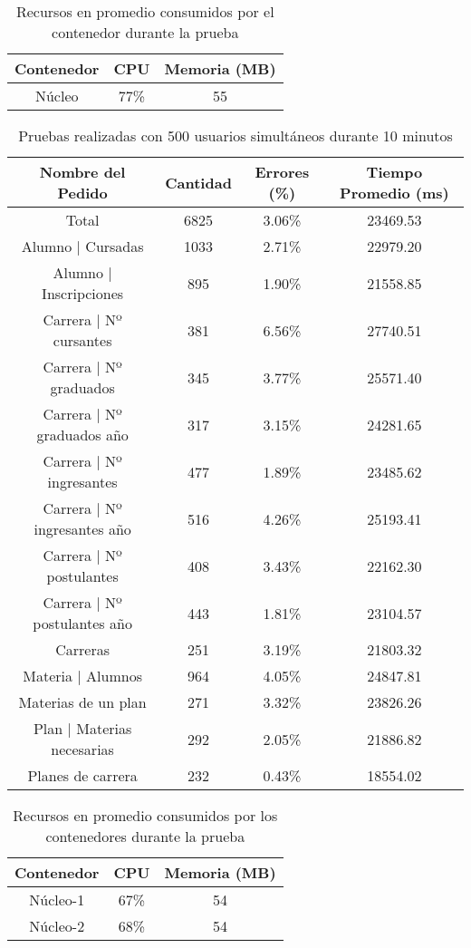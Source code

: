 \begin{table}[]
    \centering
    \makegapedcells
    \begin{tabular}{|c|c|c}
    \hline
    Contenedor & CPU & Memoria (MB)\\ \hline
    Núcleo & 77\% & 55 \\ \hline
    \end{tabular}
    \caption{Recursos en promedio consumidos por el contenedor durante la prueba}
    \label{tab:tabla_planes}
\end{table}

\begin{table}[]
    \centering
    \makegapedcells
    \begin{tabular}{|c|c|c|c|}
    \hline
    Nombre del Pedido & Cantidad & Errores (\%) & Tiempo Promedio (ms) \\ \hline
    Total & 6825 & 3.06\% & 23469.53 \\ \hline
    Alumno | Cursadas & 1033 & 2.71\% & 22979.20 \\ \hline
    Alumno | Inscripciones & 895 & 1.90\% & 21558.85\\ \hline
    Carrera | Nº cursantes & 381 & 6.56\% & 27740.51\\ \hline
    Carrera | Nº graduados & 345 & 3.77\% & 25571.40\\ \hline
    Carrera | Nº graduados año & 317 & 3.15\% & 24281.65\\ \hline
    Carrera | Nº ingresantes & 477 & 1.89\% & 23485.62\\ \hline
    Carrera | Nº ingresantes año & 516 & 4.26\% & 25193.41\\ \hline
    Carrera | Nº postulantes & 408 & 3.43\% & 22162.30\\ \hline
    Carrera | Nº postulantes año & 443 & 1.81\% & 23104.57\\ \hline
    Carreras & 251 & 3.19\% & 21803.32\\ \hline
    Materia | Alumnos & 964 & 4.05\% & 24847.81\\ \hline
    Materias de un plan & 271 & 3.32\% & 23826.26\\ \hline
    Plan | Materias necesarias & 292 & 2.05\% & 21886.82\\ \hline
    Planes de carrera & 232 & 0.43\% & 18554.02\\ \hline

    \end{tabular}
    \caption{Pruebas realizadas con 500 usuarios simultáneos durante 10 minutos}
    \label{tab:tabla_planes}
\end{table}

\begin{table}[]
    \centering
    \makegapedcells
    \begin{tabular}{|c|c|c}
    \hline
    Contenedor & CPU & Memoria (MB)\\ \hline
    Núcleo-1 & 67\% & 54 \\ \hline
    Núcleo-2 & 68\% & 54 \\ \hline
    \end{tabular}
    \caption{Recursos en promedio consumidos por los contenedores durante la prueba}
    \label{tab:tabla_planes}
\end{table}